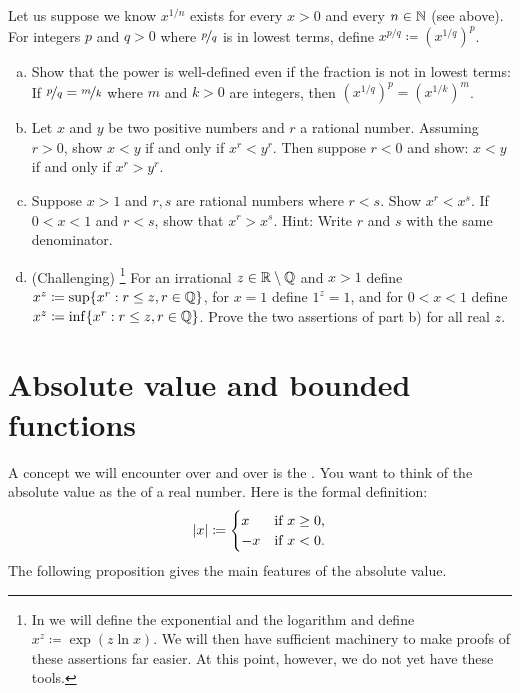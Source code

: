 \begin{samepage}
\begin{exercise} \label{exercise:realpower}
Let us suppose we know $x^{1/n}$ exists for every $x > 0$ and every $n \in
{\mathbb{N}}$ (see  above).
For integers $p$ and $q > 0$ where $\nicefrac{p}{q}$ is in lowest terms,
define $x^{p/q} \coloneqq
{(x^{1/q})}^p$.
\begin{enumerate}[a)]
\item
Show that the power is well-defined even
if the fraction is not in lowest terms: If $\nicefrac{p}{q} =
\nicefrac{m}{k}$ where $m$ and $k > 0$ are integers, then
${(x^{1/q})}^p = {(x^{1/k})}^m$.
\item
Let $x$ and $y$ be two positive numbers and $r$ a rational number.
Assuming $r > 0$, show
$x < y$ if and only if $x^r < y^r$.  Then suppose $r < 0$ and show:
$x < y$ if and only if $x^r > y^r$.
\item
Suppose $x > 1$ and $r,s$ are rational numbers where $r < s$.
Show $x^r < x^s$.  If $0 < x < 1$ and $r < s$, show that $x^r > x^s$.
Hint: Write $r$ and $s$ with the same denominator.
\item
(Challenging)%
\footnote{In
we will define the exponential and the logarithm and
define $x^z \coloneqq \exp(z \ln x)$.  We will then have
sufficient machinery to make proofs of these assertions far easier.  At this
point, however, we do not yet have these tools.}
For an irrational $z \in {\mathbb{R}} \setminus {\mathbb{Q}}$ and $x > 1$ define
$x^z \coloneqq \sup \{ x^r : r \leq z, r \in {\mathbb{Q}} \}$,
for $x=1$ define $1^z = 1$,
and for $0 < x < 1$ define
$x^z \coloneqq \inf \{ x^r : r \leq z, r \in {\mathbb{Q}} \}$.
Prove the two assertions of part b) for all real $z$.
\end{enumerate}
\end{exercise}
\end{samepage}




\sectionnewpage
\section{Absolute value and bounded functions} \label{sec:absval}


A concept we will encounter over and over is the
\emph{}.
You want to think of the absolute value as the  of a real number.
Here is the formal definition:
\begin{equation*}
\lvert {x} \rvert \coloneqq
\begin{cases}
x & \text{if } x \geq 0, \\
-x & \text{if } x < 0 .
\end{cases}
\end{equation*}
The following proposition gives
the main features of the absolute
value.

